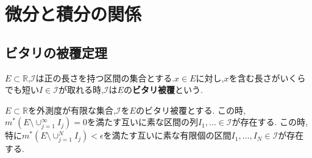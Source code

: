 \section{微分と積分の関係}

\subsection{ビタリの被覆定理}
\begin{screen}
\begin{dfn}
 $E \subset \mathbb{R}$,$\mathcal{I}$は正の長さを持つ区間の集合とする.$x \in E$に対し,$x$を含む長さがいくらでも短い$I \in \mathcal{I}$が取れる時,$\mathcal{I}$は$E$の\textbf{ビタリ被覆}という.
\end{dfn}
\end{screen}

\begin{thm}[ビタリの被覆定理]
$E \subset \mathbb{R}$を外測度が有限な集合,$\mathcal{I}$を$E$のビタリ被覆とする.
この時,$m^{*}(E \setminus \cup_{j=1}^{\infty} I_j) =0$を満たす互いに素な区間の列$I_1, \ldots \in \mathcal{I}$が存在する.
この時,特に$m^*(E \setminus \cup_{j=1}^N I_j) < \epsilon$を満たす互いに素な有限個の区間$I_1, \ldots, I_N \in \mathcal{I}$が存在する.
\end{thm}
